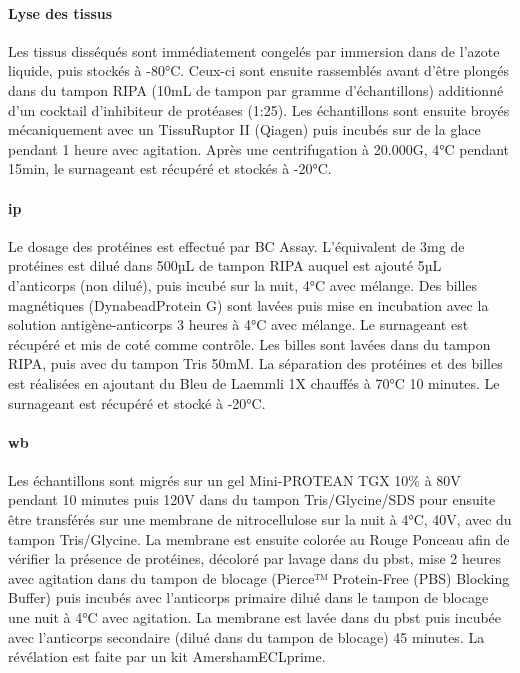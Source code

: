 \paragraph{Lyse des tissus}
\label{par:lyse}
	Les tissus disséqués sont immédiatement congelés par immersion dans de l'azote liquide, puis stockés à -80°C. Ceux-ci sont ensuite rassemblés avant d'être plongés dans du tampon RIPA (10mL de tampon par gramme d'échantillons) additionné d'un cocktail d'inhibiteur de protéases (1:25). Les échantillons sont ensuite broyés mécaniquement avec un TissuRuptor II (Qiagen\textregistered) puis incubés sur de la glace pendant 1 heure avec agitation. Après une centrifugation à 20.000G, 4°C pendant 15min, le surnageant est récupéré et stockés à -20°C. 
	
\paragraph{\Acrlong{ip}}
\label{par:ip}
	Le dosage des protéines est effectué par BC Assay. L'équivalent de 3mg de protéines est dilué dans 500µL de tampon RIPA auquel est ajouté 5µL d'anticorps (non dilué), puis incubé sur la nuit, 4°C avec mélange. Des billes magnétiques (Dynabead\textregistered Protein G) sont lavées puis mise en incubation avec la solution antigène-anticorps 3 heures à 4°C avec mélange. Le surnageant est récupéré et mis de coté comme contrôle. Les billes sont lavées dans du tampon RIPA, puis avec du tampon Tris 50mM. La séparation des protéines et des billes est réalisées en ajoutant du Bleu de Laemmli 1X chauffés à 70°C 10 minutes. Le surnageant est récupéré et stocké à -20°C. 
	
\paragraph{\Acrlong{wb}}
\label{par:wb}
	Les échantillons sont migrés sur un gel Mini-PROTEAN\textregistered{}  TGX 10\% à 80V pendant 10 minutes puis 120V dans du tampon Tris/Glycine/SDS pour ensuite être transférés sur une membrane de nitrocellulose sur la nuit à 4°C, 40V, avec du tampon Tris/Glycine. La membrane est ensuite colorée au Rouge Ponceau afin de vérifier la présence de protéines, décoloré par lavage dans du \acrshort{pbst}, mise 2 heures avec agitation dans du tampon de blocage (Pierce™ Protein-Free (PBS) Blocking Buffer) puis incubés avec l'anticorps primaire dilué dans le tampon de blocage une nuit à 4°C avec agitation. La membrane est lavée dans du \acrshort{pbst} puis incubée avec l'anticorps secondaire (dilué dans du tampon de blocage) 45 minutes. La révélation est faite par un kit Amersham\texttrademark ECL\texttrademark prime.
		
